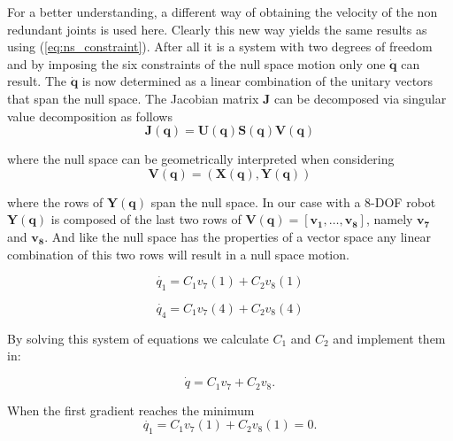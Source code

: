 For a better understanding, a different way of obtaining the velocity of the non redundant joints is used here. Clearly this new way yields the same results as using  (\ref{eq:ns_constraint}). After all it is a system with two degrees of freedom and by imposing the six constraints of the null space motion only one $\mathbf{\dot{q}}$ can result.
The $\dot{\mathbf{q}}$ is now determined as a linear combination of the unitary vectors that span the null space.
The Jacobian matrix $\mathbf{J}$ can be decomposed via singular value decomposition \cite{svd} as follows
\begin{equation}
\mathbf{J}(\mathbf{q})=\mathbf{U}(\mathbf{q}) \mathbf{S}(\mathbf{q}) \mathbf{V}(\mathbf{q})
\label{eq:svd}
\end{equation}

where the null space can be geometrically interpreted when considering 
\begin{equation}
\mathbf{V}(\mathbf{q})=(\mathbf{X}(\mathbf{q}),\mathbf{Y}(\mathbf{q}))
\label{eq:4.32Dietrich}
\end{equation}

where the rows of $\mathbf{Y}(\mathbf{q})$ span the null space. In our case with a 8-DOF robot $\mathbf{Y}(\mathbf{q})$  is composed of the last two rows of $\mathbf{V}(\mathbf{q}) = [ \mathbf{v_1}, \dots , \mathbf{v_8}]$, namely $\mathbf{v_7}$ and $\mathbf{v_8}$. And like the null space has the properties of a vector space any linear combination of this two rows will result in a null space motion. 

\begin{equation}
\dot{q_1}  = C_1 v_7(1) + C_2 v_8(1) 
\label{eq:}
\end{equation}

\begin{equation}
\dot{q_4} = C_1 v_7(4) + C_2 v_8(4)
\label{eq:}
\end{equation}



By solving this system of equations we calculate $C_1$ and $C_2$ and implement them in:

\begin{equation}
\dot{q} = C_1 v_7 + C_2 v_8 .
\label{eq:}
\end{equation}

When the first gradient reaches the minimum \begin{equation}
\dot{q_1}  = C_1 v_7(1) + C_2 v_8(1) = 0 .
\label{eq:}
\end{equation}

